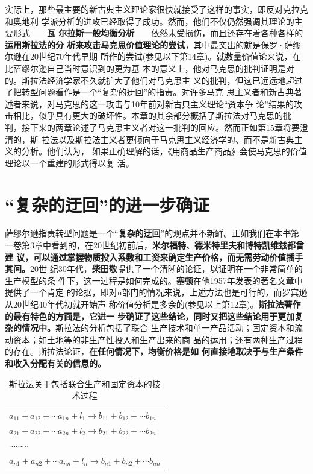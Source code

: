 实际上，那些最主要的新古典主义理论家很快就接受了这样的事实，即反对克拉克和奥地利
学派分析的进攻已经取得了成功。然而，他们不仅仍然强调其理论的主要形式——\textbf{瓦
  尔拉斯一般均衡分析}——依然未受损伤，而且还存在着各种各样的\textbf{运用斯拉法的分
  析来攻击马克思价值理论的尝试}，其中最突出的就是保罗·萨缪尔逊在20世纪70年代早期
所作的尝试(参见以下第14章)。就数量价值论来说，在比萨缪尔逊自己当时意识到的更为基
本的意义上，他对马克思的批判证明是对的。斯拉法经济学家不久就扩大了他们对马克思主
义的批判，但这已远远地超过了把转型问题看作是一个“复杂的迂回”的指责。对许多马克
思主义者和新古典著述者来说，对马克思的这一攻击与10年前对新古典主义理论“资本争
论”结果的攻击相比，似乎具有更大的破坏性。本章的其余部分概括了斯拉法对马克思的批
判，接下来的两章论述了马克思主义者对这一批判的回应。然而正如第15章将要澄清的，斯
拉法以及斯拉法主义者更倾向于马克思主义经济学的、而不是新古典主义的分析。他们认为，
如果正确理解的话，《用商品生产商品》会使马克思的价值理论以一个重建的形式得以复
活。

\section{“复杂的迂回”的进一步确证}

萨缪尔逊指责转型问题是一个“\textbf{复杂的迂回}”的观点并不新鲜。正如我们在本书第
一卷第3章中看到的，在20世纪初前后，\textbf{米尔福特、德米特里夫和博特凯维兹都曾建
  议，可以通过掌握物质投入系数和工资来确定生产价格，而无需劳动价值插手其间。}20世
纪30年代，\textbf{柴田敬}提供了一个清晰的论证，以证明在一个非常简单的生产模型的条
件下，这一过程是如何完成的。\textbf{塞顿}在他1957年发表的著名文章中提供了一个肯定
的论据，即对n部门的情况来说，上述方法也是可行的，而罗宾逊从20世纪40年代初就开始声
称价值分析是多余的(参见以上第12章)。\textbf{斯拉法著作的最有特色的方面是，它进一
  步确证了这些结论，同时又把这些结论用于更加复杂的情况中。}斯拉法的分析包括了联合
生产技术和单一产品活动；固定资本和流动资本；如土地等的非生产性投入和生产出来的商
品的运用；还有两种生产过程的存在。斯拉法论证，\textbf{在任何情况下，均衡价格是如
  何直接地取决于与生产条件和收入分配有关的信息的。}

\begin{table}[htbp]
\centering
\caption{斯拉法关于包括联合生产和固定资本的技术过程}
\label{t:Sraffa1}
\begin{tabular}{l}
  $\displaystyle a_{11}+a_{12}+ \cdots a_{1n}+l_{1} \rightarrow b_{11}+b_{12}+ \cdots b_{1n} $\\
  $\displaystyle a_{21}+a_{22}+ \cdots a_{2n}+l_{2} \rightarrow b_{21}+b_{22}+ \cdots b_{2n}$\\
  $\displaystyle \cdots \cdots \cdots$\\
  $\displaystyle a_{n1}+a_{n2}+ \cdots a_{nn}+l_{n} \rightarrow b_{n1}+b_{n2}+ \cdots b_{nn} $
\end{tabular}
\end{table}

